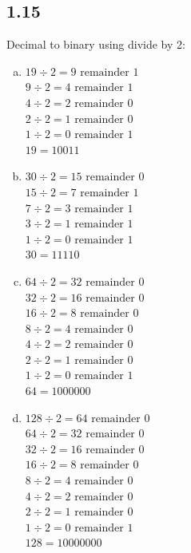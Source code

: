 \documentclass{article}
\begin{document}
\subsection*{1.15}
Decimal to binary using divide by 2:
\begin{enumerate}[(a)]
    \item 
    $19 \div 2 = 9 \text{ remainder } 1$ \\
    $9 \div 2 = 4 \text{ remainder } 1$ \\
    $4 \div 2 = 2 \text{ remainder } 0$ \\
    $2 \div 2 = 1 \text{ remainder } 0$ \\
    $1 \div 2 = 0 \text{ remainder } 1$ \\
    $19 = 10011$
    \item 
    $30 \div 2 = 15 \text{ remainder } 0$ \\
    $15 \div 2 = 7 \text{ remainder } 1$ \\
    $7 \div 2 = 3 \text{ remainder } 1$ \\
    $3 \div 2 = 1 \text{ remainder } 1$ \\
    $1 \div 2 = 0 \text{ remainder } 1$ \\
    $30 = 11110$
    \item 
    $64 \div 2 = 32 \text{ remainder } 0$ \\
    $32 \div 2 = 16 \text{ remainder } 0$ \\
    $16 \div 2 = 8 \text{ remainder } 0$ \\
    $8 \div 2 = 4 \text{ remainder } 0$ \\
    $4 \div 2 = 2 \text{ remainder } 0$ \\
    $2 \div 2 = 1 \text{ remainder } 0$ \\
    $1 \div 2 = 0 \text{ remainder } 1$ \\
    $64 = 1000000$
    \item 
    $128 \div 2 = 64 \text{ remainder } 0$ \\
    $64 \div 2 = 32 \text{ remainder } 0$ \\
    $32 \div 2 = 16 \text{ remainder } 0$ \\
    $16 \div 2 = 8 \text{ remainder } 0$ \\
    $8 \div 2 = 4 \text{ remainder } 0$ \\
    $4 \div 2 = 2 \text{ remainder } 0$ \\
    $2 \div 2 = 1 \text{ remainder } 0$ \\
    $1 \div 2 = 0 \text{ remainder } 1$ \\
    $128 = 10000000$
\end{enumerate}
\end{document}
